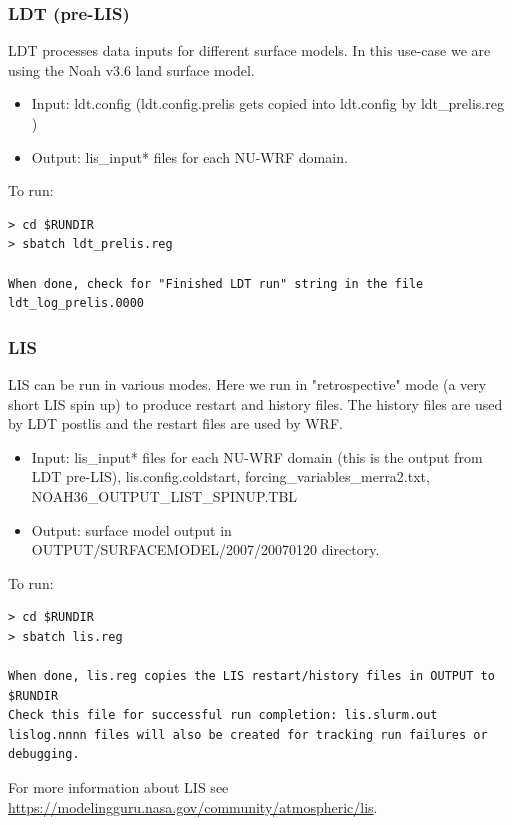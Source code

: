 \begin{frame}[fragile]\frametitle{LDT (pre-LIS)}

\footnotesize{
LDT processes data inputs for different surface models. In this use-case we are using the Noah v3.6 land surface model.
\begin{itemize}
\item Input: ldt.config (ldt.config.prelis gets copied into ldt.config by ldt\_prelis.reg )
\item Output: lis\_input* files for each NU-WRF domain.
\end{itemize}
}    
\hrulefill\par
\footnotesize{To run:}
\begin{lstlisting}
> cd $RUNDIR
> sbatch ldt_prelis.reg

When done, check for "Finished LDT run" string in the file ldt_log_prelis.0000
\end{lstlisting}

\end{frame}

\begin{frame}[fragile]\frametitle{LIS}

\scriptsize{
LIS  can be run in various modes. Here we run in "retrospective" mode (a very short LIS spin up) to produce  restart and history files. The history files are used by LDT postlis and the restart files are used by WRF. 
\begin{itemize}
\item Input:  lis\_input* files for each NU-WRF domain (this is the output from LDT pre-LIS), lis.config.coldstart,  forcing\_variables\_merra2.txt, NOAH36\_OUTPUT\_LIST\_SPINUP.TBL 
\item Output: surface model output in OUTPUT/SURFACEMODEL/2007/20070120 directory. 
\end{itemize}
}    
\hrulefill\par
\scriptsize{To run:}
\begin{lstlisting}
> cd $RUNDIR
> sbatch lis.reg

When done, lis.reg copies the LIS restart/history files in OUTPUT to $RUNDIR
Check this file for successful run completion: lis.slurm.out 
lislog.nnnn files will also be created for tracking run failures or debugging.
\end{lstlisting}
\scriptsize{
For more information about LIS see \url{https://modelingguru.nasa.gov/community/atmospheric/lis}.
}
\end{frame}

